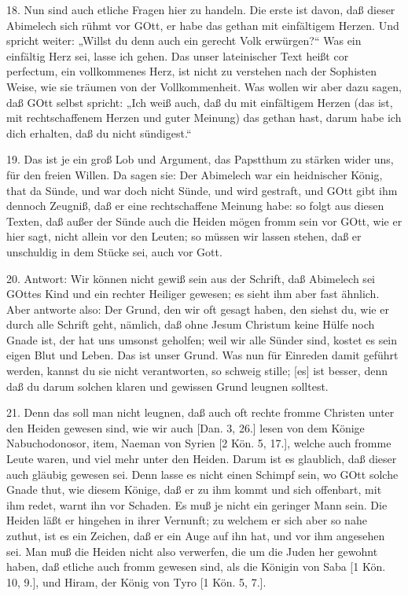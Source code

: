 18. Nun sind auch etliche Fragen hier zu handeln. Die erste ist davon, daß dieser Abimelech sich rühmt vor GOtt, er habe das gethan mit einfältigem Herzen. Und spricht weiter: „Willst du denn auch ein gerecht Volk erwürgen?“ Was ein einfältig Herz sei, lasse ich gehen. Das unser lateinischer Text heißt cor perfectum, ein vollkommenes Herz, ist nicht zu verstehen nach der Sophisten Weise, wie sie träumen von der Vollkommenheit. Was wollen wir aber dazu sagen, daß GOtt selbst spricht: „Ich weiß auch, daß du mit einfältigem Herzen (das ist, mit rechtschaffenem Herzen und guter Meinung) das gethan hast, darum habe ich dich erhalten, daß du nicht sündigest.“

19. Das ist je ein groß Lob und Argument, das Papstthum zu stärken wider uns, für den freien Willen. Da sagen sie: Der Abimelech war ein heidnischer König, that da Sünde, und war doch nicht Sünde, und wird gestraft, und GOtt gibt ihm dennoch Zeugniß, daß er eine rechtschaffene Meinung habe: so folgt aus diesen Texten, daß außer der Sünde auch die Heiden mögen fromm sein vor GOtt, wie er hier sagt, nicht allein vor den Leuten; so müssen wir lassen stehen, daß er unschuldig in dem Stücke sei, auch vor Gott.

20. Antwort: Wir können nicht gewiß sein aus der Schrift, daß Abimelech sei GOttes Kind und ein rechter Heiliger gewesen; es sieht ihm aber fast ähnlich. Aber antworte also: Der Grund, den wir oft gesagt haben, den siehst du, wie er durch alle Schrift geht, nämlich, daß ohne
Jesum Christum keine Hülfe noch Gnade ist, der hat uns umsonst geholfen; weil wir alle Sünder sind, kostet es sein eigen Blut und Leben. Das ist unser Grund. Was nun für Einreden damit geführt werden, kannst du sie nicht verantworten, so schweig stille; [es] ist besser, denn daß du darum solchen klaren und gewissen Grund leugnen solltest.

21. Denn das soll man nicht leugnen, daß auch oft rechte fromme Christen unter den Heiden gewesen sind, wie wir auch [Dan. 3, 26.] lesen von dem Könige Nabuchodonosor, item, Naeman von Syrien [2 Kön. 5, 17.], welche auch fromme Leute waren, und viel mehr unter den Heiden. Darum ist es glaublich, daß dieser auch gläubig gewesen sei. Denn lasse es nicht einen Schimpf sein, wo GOtt solche Gnade thut, wie diesem Könige, daß er zu ihm kommt und sich offenbart, mit ihm redet, warnt ihn vor Schaden. Es muß je nicht ein geringer Mann sein. Die Heiden läßt er hingehen in ihrer Vernunft; zu welchem er sich aber so nahe zuthut, ist es ein Zeichen, daß er ein Auge auf ihn hat, und vor ihm angesehen sei. Man muß die Heiden nicht also verwerfen, die um die Juden her gewohnt haben, daß etliche auch fromm gewesen sind, als die Königin von Saba [1 Kön. 10, 9.], und Hiram, der König von Tyro [1 Kön. 5, 7.].

